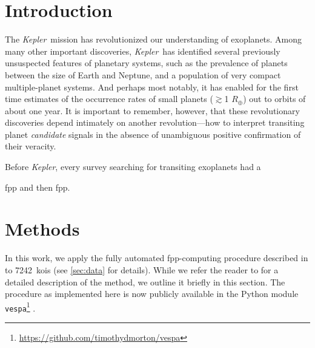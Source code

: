 \documentclass[preprint2]{aastex}
\newcommand{\ncalc}{7242}
\newcommand{\kepler}{\textit{Kepler}}
\newcommand{\vespa}{\texttt{vespa}}
\begin{document}

\keywords{}


\section{Introduction}

The \kepler\ mission has revolutionized our understanding of
exoplanets.  Among many other important discoveries, \kepler\ has
identified several previously unsuspected features of planetary
systems, such as the prevalence of planets between the size of Earth
and Neptune, and a population of very compact multiple-planet
systems. And perhaps most notably, it has enabled for the first time
estimates of the occurrence rates of small planets ($\gtrsim$1
$R_\oplus$) out to orbits of about one year.  It is important to
remember, however, that these revolutionary discoveries depend
intimately on another revolution---how to interpret transiting planet
\textit{candidate} signals in the absence of unambiguous positive
confirmation of their veracity.

Before \kepler, every survey searching for transiting exoplanets had a 

\ac{fpp} and then \ac{fpp}.


\section{Methods}
\label{sec:methods}

In this work, we apply the fully automated \ac{fpp}-computing
procedure described in \citet[][hereafter
  ]{Morton:2012} to \ncalc\ \acp{koi} (see
\autoref{sec:data} for details).  While we refer the reader to
 for a detailed description of the method, we
outline it briefly in this section.  The procedure as implemented here
is now publicly available in the Python module
\vespa\footnote{\url{https://github.com/timothydmorton/vespa}}
\citep{vespa}.
\end{document}
